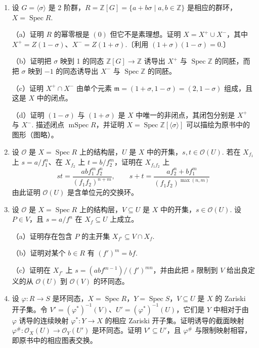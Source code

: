 \begin{enumerate}
\item 设 \(G = \langle\sigma\rangle\) 是 2 阶群，\(R = \mathbb{Z}[G] = \{a+b\sigma \mid a, b \in \mathbb{Z}\}\) 是相应的群环，\(X = \operatorname{Spec}R\).

（a）证明 \(R\) 的幂零根是 \((0)\) 但它不是素理想。证明 \(X = X^+ \cup X^-\)，其中 \(X^+ = Z(1-\sigma)\)、\(X^- = Z(1+\sigma)\).〔利用 \((1+\sigma)(1-\sigma) = 0\).〕

（b）证明把 \(\sigma\) 映到 1 的同态 \(\mathbb{Z}[G] \to \mathbb{Z}\) 诱导出 \(X^+\) 与 \(\operatorname{Spec}\mathbb{Z}\) 的同胚，而把 \(\sigma\) 映到 \(-1\) 的同态诱导出 \(X^-\) 与 \(\operatorname{Spec}\mathbb{Z}\) 的同胚。

（c）证明 \(X^+ \cap X^-\) 由单个元素 \(\mathfrak{m} = (1+\sigma, 1-\sigma) = (2, 1-\sigma)\) 组成，且这是 \(X\) 中的闭点。

（d）证明 \((1-\sigma)\) 与 \((1+\sigma)\) 是 \(X\) 中唯一的非闭点，其闭包分别是 \(X^+\) 与 \(X^-\). 描述闭点 \(\operatorname{mSpec}R\)，并证明 \(X = \operatorname{Spec}\mathbb{Z}[\langle\sigma\rangle]\) 可以描绘为原书中的图形（图略）。

\item 设 \(\mathcal{O}\) 是 \(X = \operatorname{Spec}R\) 上的结构层，\(U\) 是 \(X\) 中的开集，\(s, t \in \mathcal{O}(U)\). 若在 \(X_{f_1}\) 上 \(s = a/f_1^n\)、在 \(X_{f_2}\) 上 \(t = b/f_2^m\)，证明在 \(X_{f_1f_2}\) 上
\[
st = \frac{abf_1^mf_2^n}{(f_1f_2)^{n+m}}, \qquad s+t = \frac{af_2^n+b f_1^m}{(f_1f_2)^{\max(n,m)}}
\]
由此证明 \(\mathcal{O}(U)\) 是含单位元的交换环。

\item 设 \(\mathcal{O}\) 是 \(X = \operatorname{Spec}R\) 上的结构层，\(V \subseteq U\) 是 \(X\) 中的开集，\(s \in \mathcal{O}(U)\). 设 \(P \in V\)，且 \(s = a/f^n\) 在 \(X_f \subseteq U\) 上成立。

（a）证明存在包含 \(P\) 的主开集 \(X_{f'} \subseteq V \cap X_f\).

（b）证明对某个 \(b \in R\) 有 \((f')^m = bf\).

（c）证明在 \(X_{f'}\) 上 \(s = (abf^{m-1})/(f')^{mn}\)，并由此把 \(s\) 限制到 \(V\) 给出良定义的从 \(\mathcal{O}(U)\) 到 \(\mathcal{O}(V)\) 的环同态。

\item 设 \(\varphi : R \to S\) 是环同态，\(X = \operatorname{Spec}R\)，\(Y = \operatorname{Spec}S\)，\(V \subseteq U\) 是 \(X\) 的 Zariski 开子集。令 \(V' = (\varphi^*)^{-1}(V)\)、\(U' = (\varphi^*)^{-1}(U)\)，它们是 \(Y\) 中相对于由 \(\varphi\) 诱导的连续映射 \(\varphi^* : Y \to X\) 的相应 Zariski 开子集。证明诱导的截面映射 \(\varphi^{\#} : \mathcal{O}_X(U) \to \mathcal{O}_Y(U')\) 是环同态。证明 \(V' \subseteq U'\)，且 \(\varphi^{\#}\) 与限制映射相容，即原书中的相应图表交换。


\end{enumerate}

